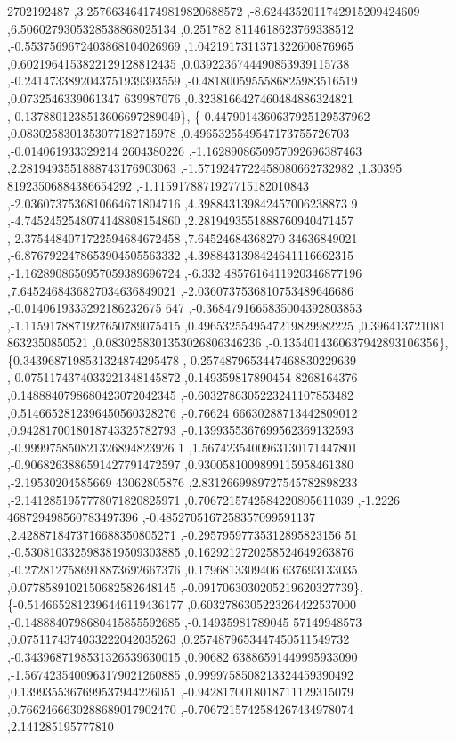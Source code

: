 \begin{DoxyCode}
      2702192487 ,3.2576634641749819820688572 ,-8.6244352011742915209424609 ,6.5060279305328538868025134 ,0.251782
      8114618623769338512 ,-0.5537569672403868104026969 ,1.0421917311371322600876965 ,0.6021964153822129128812435 
      ,0.0392236744490853939115738 ,-0.2414733892043751939393559 ,-0.4818005955586825983516519 ,0.0732546339061347
      639987076 ,0.3238166427460484886324821 ,-0.1378801238513606697289049\},
\{-0.4479014360637925129537962 ,0.0830258301353077182715978 ,0.4965325549547173755726703 ,-0.014061933329214
      2604380226 ,-1.1628908650957092696387463 ,2.2819493551888743176903063 ,-1.5719247722458080662732982 ,1.30395
      81923506884386654292 ,-1.1159178871927715182010843 ,-2.0360737536810664671804716 ,4.398843139842457006238873
      9 ,-4.7452452548074148808154860 ,2.2819493551888760940471457 ,-2.3754484071722594684672458 ,7.64524684368270
      34636849021 ,-6.8767922478653904505563332 ,4.3988431398424641116662315 ,-1.1628908650957059389696724 ,-6.332
      4857616411920346877196 ,7.6452468436827034636849021 ,-2.0360737536810753489646686 ,-0.0140619333292186232675
      647 ,-0.3684791665835004392803853 ,-1.1159178871927650789075415 ,0.4965325549547219829982225 ,0.396413721081
      8632350850521 ,0.0830258301353026806346236 ,-0.1354014360637942893106356\},
\{0.3439687198531324874295478 ,-0.2574879653447468830229639 ,-0.0751174374033221348145872 ,0.149359817890454
      8268164376 ,0.1488840798680423072042345 ,-0.6032786305223241107853482 ,0.5146652812396450560328276 ,-0.76624
      66630288713442809012 ,0.9428170018018743325782793 ,-0.1399355367699562369132593 ,-0.999975850821326894823926
      1 ,1.5674235400963130171447801 ,-0.9068263886591427791472597 ,0.9300581009899115958461380 ,-2.19530204585669
      43062805876 ,2.8312669989727545782898233 ,-2.1412851957778071820825971 ,0.7067215742584220805611039 ,-1.2226
      468729498560783497396 ,-0.4852705167258357099591137 ,2.4288718473716688350805271 ,-0.29579597735312895823156
      51 ,-0.5308103325983819509303885 ,0.1629212720258524649263876 ,-0.2728127586918873692667376 ,0.1796813309406
      637693133035 ,0.0778589102150682582648145 ,-0.0917063030205219620327739\},
\{-0.5146652812396446119436177 ,0.6032786305223264422537000 ,-0.1488840798680415855592685 ,-0.14935981789045
      57149948573 ,0.0751174374033222042035263 ,0.2574879653447450511549732 ,-0.3439687198531326539630015 ,0.90682
      63886591449995933090 ,-1.5674235400963179021260885 ,0.9999758508213324459390492 ,0.1399355367699537944226051
       ,-0.9428170018018711129315079 ,0.7662466630288689017902470 ,-0.7067215742584267434978074 ,2.141285195777810

\end{DoxyCode}
